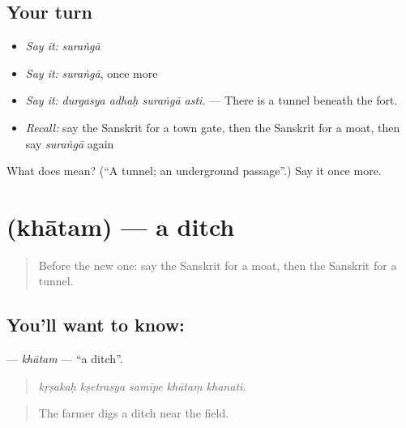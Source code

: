\subsection*{Your turn}
\begin{itemize}
\raggedright
  \item \emph{Say it:} \emph{suraṅgā}
  \item \emph{Say it:} \emph{suraṅgā}, once more
  \item \emph{Say it:} \emph{durgasya adhaḥ suraṅgā asti.} — There is a tunnel beneath the fort.
  \item \emph{Recall:} say the Sanskrit for a town gate, then the Sanskrit for a moat, then say \emph{suraṅgā} again
\end{itemize}

\begin{tcolorbox}[breakable,colback=teal!4,colframe=teal!35!black,title={Before you move on}]
What does  mean? (\textquotedblleft{}A tunnel; an underground passage\textquotedblright{}.) Say it once more.
\end{tcolorbox}
\section[\texorpdfstring{\sk{खातम्} (khātam)}{खातम् (khātam)}]{ (khātam) — a ditch}

\label{lesson:SA-C422-khatam}



\begin{quote}
Before the new one: say the Sanskrit for a moat, then the Sanskrit for a tunnel.
\end{quote}

\subsection*{You'll want to know: }
\textbf{} — \emph{khātam} — \textquotedblleft{}a ditch\textquotedblright{}.

\begin{quote}
    
\end{quote}

\begin{quote}
\emph{kṛṣakaḥ kṣetrasya samīpe khātaṃ khanati.}
\end{quote}

\begin{quote}
The farmer digs a ditch near the field.
\end{quote}

